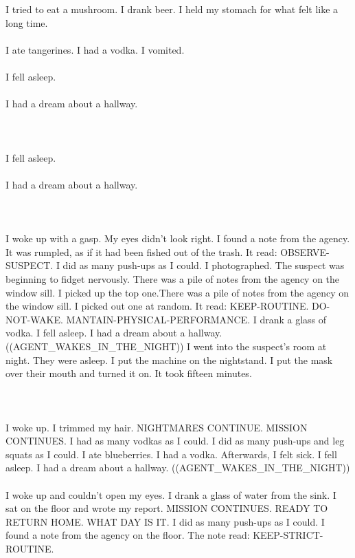 \documentclass{article}
\begin{document}
    \section{}
    I tried to eat a mushroom. I drank beer. I held my stomach for what felt like a long time.\\\\I ate tangerines. I had a vodka. I vomited.\\\\I fell asleep.\\\\I had a dream about a hallway.\\\\ 
    \newpage
    
    \section{}
    I fell asleep.\\\\I had a dream about a hallway.\\\\ 
    \newpage
    
    \section{}
    I woke up with a gasp. My eyes didn't look right. I found a note from the agency. It was rumpled, as if it had been fished out of the trash. It read: OBSERVE-SUSPECT. I did as many push-ups as I could. I photographed. The suspect was beginning to fidget nervously. There was a pile of notes from the agency on the window sill. I picked up the top one.There was a pile of notes from the agency on the window sill. I picked out one at random. It read: KEEP-ROUTINE. DO-NOT-WAKE. MANTAIN-PHYSICAL-PERFORMANCE. I drank a glass of vodka. I fell asleep. I had a dream about a hallway. ((AGENT_WAKES_IN_THE_NIGHT)) I went into the suspect's room at night. They were asleep. I put the machine on the nightstand. I put the mask over their mouth and turned it on. It took fifteen minutes. \\\\
    \newpage
    
    \section{}
    I woke up. I trimmed my hair. NIGHTMARES CONTINUE. MISSION CONTINUES. I had as many vodkas as I could. I did as many push-ups and leg squats as I could. I ate blueberries. I had a vodka. Afterwards, I felt sick. I fell asleep. I had a dream about a hallway. ((AGENT_WAKES_IN_THE_NIGHT)) \\\\I woke up and couldn't open my eyes. I drank a glass of water from the sink. I sat on the floor and wrote my report. MISSION CONTINUES. READY TO RETURN HOME. WHAT DAY IS IT. I did as many push-ups as I could. I found a note from the agency on the floor. The note read: KEEP-STRICT-ROUTINE. \\\\
    \newpage
    
\end{document}
